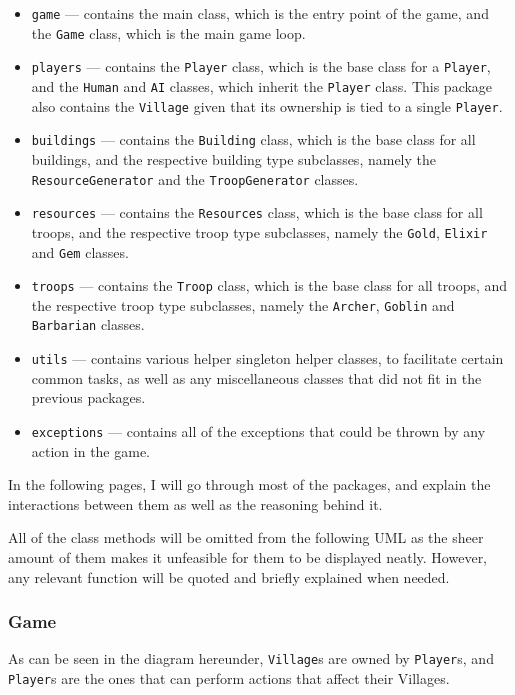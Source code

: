 \documentclass{article}
\newcommand{\code}[1]{\texttt{#1}}
\begin{document}
\begin{itemize}
	
	\item \code{game} --- contains the main class, which is the entry point of the game, and the \code{Game} class, which is the main game loop.
	\item \code{players} --- contains the \code{Player} class, which is the base class for a \code{Player}, and the \code{Human} and \code{AI} classes, which inherit the \code{Player} class. This package also contains the \code{Village} given that its ownership is tied to a single \code{Player}.
	\item \code{buildings} --- contains the \code{Building} class, which is the base class for all buildings, and the respective building type subclasses, namely the \code{ResourceGenerator} and the \code{TroopGenerator} classes.
	\item \code{resources} --- contains the \code{Resources} class, which is the base class for all troops, and the respective troop type subclasses, namely the \code{Gold}, \code{Elixir} and \code{Gem} classes.
	\item \code{troops} --- contains the \code{Troop} class, which is the base class for all troops, and the respective troop type subclasses, namely the \code{Archer}, \code{Goblin} and \code{Barbarian} classes.
	\item \code{utils} --- contains various helper singleton helper classes, to facilitate certain common tasks, as well as any miscellaneous classes that did not fit in the previous packages.
	\item \code{exceptions} --- contains all of the exceptions that could be thrown by any action in the game.
	      
\end{itemize}

In the following pages, I will go through most of the packages, and explain the interactions between them as well as the reasoning behind it.


All of the class methods will be omitted from the following UML as the sheer amount of them makes it unfeasible for them to be displayed neatly.
However, any relevant function will be quoted and briefly explained when needed.


\subsubsection*{Game}

As can be seen in the diagram hereunder, \code{Village}s are owned by
\code{Player}s, and \code{Player}s are the ones that can perform actions that
affect their Villages.
\end{document}
